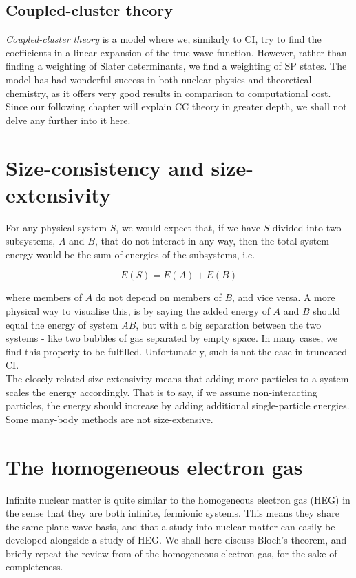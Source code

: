 \documentclass[10pt,twoside]{report}
\begin{document}
	\subsection{Coupled-cluster theory}
	\emph{Coupled-cluster theory} is a model where we, similarly to CI, try to find the coefficients in a linear expansion of the true wave function. However, rather than finding a weighting of Slater determinants, we find a weighting of SP states. The model has had wonderful success in both nuclear physics and theoretical chemistry, as it offers very good results in comparison to computational cost. Since our following chapter will explain CC theory in greater depth, we shall not delve any further into it here.
	
	\section{Size-consistency and size-extensivity}
	For any physical system $S$, we would expect that, if we have $S$ divided into two subsystems, $A$ and $B$, that do not interact in any way, then the total system energy would be the sum of energies of the subsystems, i.e.
	
	\begin{equation}
		E(S) = E(A) + E(B)
	\end{equation}
	
	\noindent where members of $A$ do not depend on members of $B$, and vice versa. A more physical way to visualise this, is by saying the added energy of $A$ and $B$ should equal the energy of system $AB$, but with a big separation between the two systems - like two bubbles of gas separated by empty space. In many cases, we find this property to be fulfilled. Unfortunately, such is not the case in truncated CI.\\
	
	The closely related size-extensivity means that adding more particles to a system scales the energy accordingly. That is to say, if we assume non-interacting particles, the energy should increase by adding additional single-particle energies. Some many-body methods are not size-extensive.
	
	\section{The homogeneous electron gas}
	Infinite nuclear matter is quite similar to the homogeneous electron gas (HEG) in the sense that they are both infinite, fermionic systems. This means they share the same plane-wave basis, and that a study into nuclear matter can easily be developed alongside a study of HEG. We shall here discuss Bloch's theorem, and briefly repeat the review from \cite{Hansen15} of the homogeneous electron gas, for the sake of completeness.
	
\end{document}
